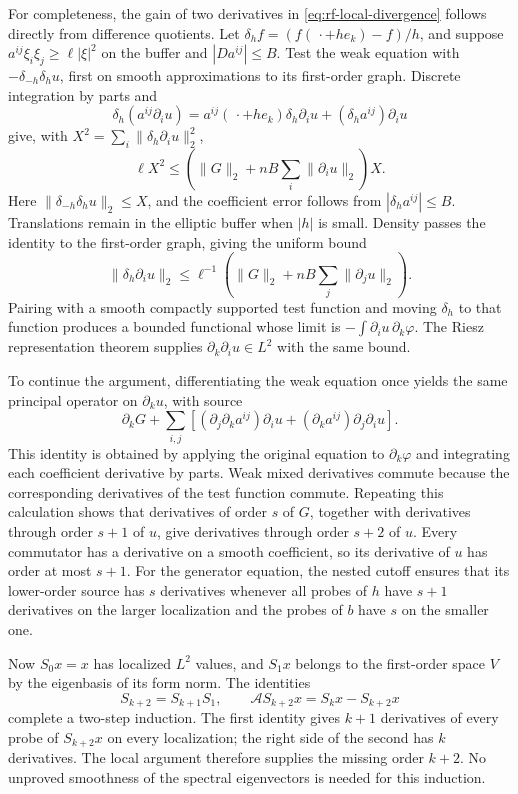 For completeness, the gain of two derivatives in
\eqref{eq:rf-local-divergence} follows directly from difference quotients.
Let $\delta_h f=(f(\,\cdot+he_k)-f)/h$, and suppose
$a^{ij}\xi_i\xi_j\geq\ell|\xi|^2$ on the buffer and
$|Da^{ij}|\leq B$.  Test the weak equation with
$-\delta_{-h}\delta_h u$, first on smooth approximations to its
first-order graph.  Discrete integration by parts and
\[
 \delta_h(a^{ij}\partial_i u)
 =a^{ij}(\,\cdot+he_k)\delta_h\partial_i u
      +(\delta_h a^{ij})\partial_i u
\]
give, with $X^2=\sum_i\|\delta_h\partial_i u\|_2^2$,
\[
 \ell X^2
 \leq \left(\|G\|_2+nB\sum_i\|\partial_i u\|_2\right)X.
\]
Here $\|\delta_{-h}\delta_h u\|_2\leq X$, and the coefficient
error follows from $|\delta_h a^{ij}|\leq B$.  Translations remain in
the elliptic buffer when $|h|$ is small.  Density passes the identity
to the first-order graph, giving the uniform bound
\[
 \|\delta_h\partial_i u\|_2
 \leq \ell^{-1}\left(\|G\|_2+nB\sum_j\|\partial_j u\|_2\right).
\]
Pairing with a smooth compactly supported test function and moving
$\delta_h$ to that function produces a bounded functional whose limit
is $-\int \partial_i u\,\partial_k\varphi$.  The Riesz representation
theorem supplies $\partial_k\partial_i u\in L^2$ with the same bound.

To continue the argument, differentiating the weak equation once yields
the same principal operator on $\partial_k u$, with source
\[
 \partial_kG+\sum_{i,j}\left[
  (\partial_j\partial_k a^{ij})\partial_i u
       +(\partial_k a^{ij})\partial_j\partial_i u\right].
\]
This identity is obtained by applying the original equation to
$\partial_k\varphi$ and integrating each coefficient derivative by
parts.  Weak mixed derivatives commute because the corresponding
derivatives of the test function commute.  Repeating this calculation
shows that derivatives of order $s$ of $G$, together with derivatives
through order $s+1$ of $u$, give derivatives through order $s+2$ of $u$.
Every commutator has a derivative on a smooth coefficient, so its
derivative of $u$ has order at most $s+1$.  For the generator equation,
the nested cutoff ensures that its lower-order source has $s$
derivatives whenever all probes of $h$ have $s+1$ derivatives on the
larger localization and the probes of $b$ have $s$ on the smaller one.

Now $S_0x=x$ has localized $L^2$ values, and $S_1x$ belongs to the
first-order space $V$ by the eigenbasis of its form norm.  The identities
\[
 S_{k+2}=S_{k+1}S_1,\qquad
 \mathcal A S_{k+2}x=S_kx-S_{k+2}x
\]
complete a two-step induction.  The first identity gives $k+1$
derivatives of every probe of $S_{k+2}x$ on every localization; the
right side of the second has $k$ derivatives.  The local argument
therefore supplies the missing order $k+2$.  No unproved smoothness of
the spectral eigenvectors is needed for this induction.

